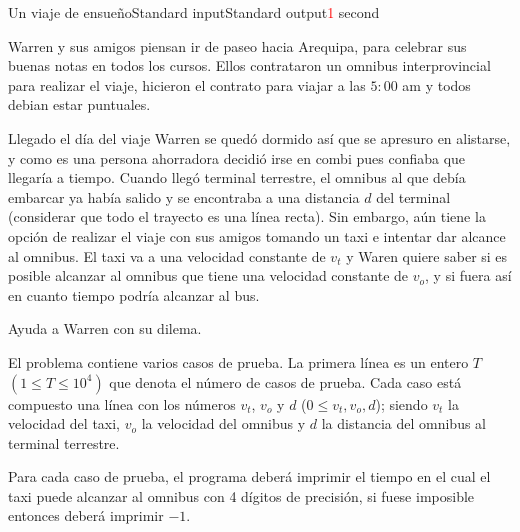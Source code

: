 \begin{problem}{Un viaje de ensue\~no}{Standard input}{Standard output}{\textcolor{red}{1} second}{}

       
Warren y sus amigos piensan ir de paseo hacia Arequipa, para celebrar sus buenas notas en todos los cursos. Ellos contrataron un omnibus interprovincial para realizar el viaje, hicieron el contrato para viajar a las $5:00$ am y todos debian estar puntuales. 

Llegado el día del viaje Warren se quedó dormido así que se apresuro en alistarse, y como es una persona ahorradora decidió irse en combi pues confiaba que llegaría a tiempo. Cuando llegó terminal terrestre, el omnibus al que debía embarcar ya había salido y se encontraba a una distancia $d$ del terminal (considerar que todo el trayecto es una línea recta). Sin embargo, aún tiene la opción de realizar el viaje con sus amigos tomando un taxi e intentar dar alcance al omnibus. El taxi va a una velocidad constante de $v_t$ y Waren quiere saber si es posible alcanzar al omnibus que tiene una velocidad constante de $v_o$, y si fuera así en cuanto tiempo podría alcanzar al bus.

Ayuda a Warren con su dilema.

\InputFile
El problema contiene varios casos de prueba. La primera l\'inea es un entero $T$ $(1\leq T \leq 10^4)$ que denota el número de casos de prueba. Cada caso está compuesto una l\'inea con los números $v_t$, $v_o$ y $d$ ($0 \leq v_t, v_o, d $); siendo $v_t$ la velocidad del taxi, $v_o$ la velocidad del omnibus y $d$ la distancia del omnibus al terminal terrestre.

\OutputFile
Para cada caso de prueba, el programa deber\'a imprimir el tiempo en el cual el taxi puede alcanzar al omnibus con 4 dígitos de precisión, si fuese imposible entonces deber\'a imprimir $-1$.

\Example

\begin{example}
\end{example}

\end{problem}

